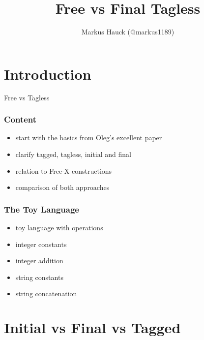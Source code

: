 \documentclass[aspectratio=169]{beamer}
\title{Free vs Final Tagless}
\author{Markus Hauck (@markus1189)}
\begin{document}
\begin{frame}
  \titlepage{}
\end{frame}

\section{Introduction}\label{sec:introduction}

\begin{frame}
  \begin{center}
    {\Huge Free vs Tagless\\}
  \end{center}
\end{frame}

\begin{frame}[fragile]
  \frametitle{Content}
  \begin{itemize}
  \item start with the basics from Oleg's excellent paper
  \item clarify tagged, tagless, initial and final
  \item relation to Free-X constructions
  \item comparison of both approaches
  \end{itemize}
\end{frame}

\begin{frame}
  \frametitle{The Toy Language}
  \begin{itemize}
  \item toy language with operations
  \item integer constants
  \item integer addition
  \item string constants
  \item string concatenation
  \end{itemize}
\end{frame}

\section{Initial vs Final vs Tagged}\label{sec:initial-final-tagged}
\end{document}
